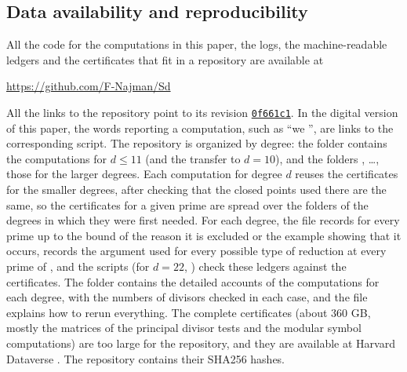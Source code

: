 \subsection*{Data availability and reproducibility}
All the code for the computations in this paper, the logs, the machine-readable ledgers and the certificates that fit in a repository are available at
\begin{center}
\url{https://github.com/F-Najman/Sd}
\end{center}
All the links to the repository point to its revision \href{https://github.com/F-Najman/Sd/tree/0f661c120f73046f759ac67c89c8a9ae14427c4f}{\texttt{0f661c1}}. In the digital version of this paper, the words reporting a computation, such as ``we '', are links to the corresponding script. The repository is organized by degree: the folder  contains the computations for $d\leq 11$ (and  the transfer to $d=10$), and the folders , \dots,  those for the larger degrees. Each computation for degree $d$ reuses the certificates for the smaller degrees, after checking that the closed points used there are the same, so the certificates for a given prime are spread over the folders of the degrees in which they were first needed. For each degree, the file  records for every prime up to the bound of  the reason it is excluded or the example showing that it occurs,  records the argument used for every possible type of reduction at every prime of , and the scripts  (for $d=22$, ) check these ledgers against the certificates. The folder  contains the detailed accounts of the computations for each degree, with the numbers of divisors checked in each case, and the  file explains how to rerun everything. The complete certificates (about $360$ GB, mostly the matrices of the principal divisor tests and the modular symbol computations) are too large for the repository, and they are available at Harvard Dataverse \cite{Ndata}. The repository contains their SHA256 hashes.

